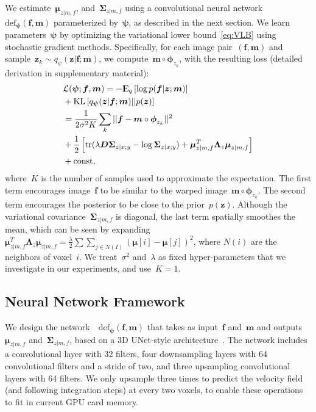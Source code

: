 \documentclass{article}
\newcommand{\bD}{\boldsymbol{D}}
\newcommand{\bmu}{\boldsymbol{\mu}}
\newcommand{\bphi}{\boldsymbol{\phi}}
\newcommand{\bpsi}{\boldsymbol{\psi}}
\newcommand{\bSigma}{\boldsymbol{\Sigma}}
\newcommand{\bLambda}{\boldsymbol{\Lambda}}
\newcommand{\KL}{\text{KL}}
\newcommand{\bz}{\boldsymbol{z}}
\newcommand{\bmoving}{\boldsymbol{m}}
\newcommand{\bfixed}{\boldsymbol{f}}
\newcommand{\moving}{m}
\newcommand{\fixed}{f}
\newcommand{\Expect}{{\rm I\kern-.3em E}}
\newcommand{\citep}{\cite}
\begin{document}
We estimate~$\bmu_{z | \moving, \fixed}$, and~$\bSigma_{z | \moving, \fixed}$ using a convolutional neural network~$\text{def}_{\bpsi}(\bfixed,\bmoving)$ parameterized by~$\bpsi$, as described in the next section.
We learn parameters~$\bpsi$ by optimizing the variational lower bound~\eqref{eq:VLB} using stochastic gradient methods. Specifically, for each image pair~$(\bfixed, \bmoving)$ and sample~$\bz_k\sim q_{\psi}(\bz|\bfixed; \bmoving)$, we compute~$\bmoving \circ \bphi_{z_k}$,
with the resulting loss (detailed derivation in supplementary material):
\begin{align}
&\mathcal{L}(\bpsi; \bfixed, \bmoving)  = - \Expect_{q} \left[ \log p(\bfixed | \bz ; \bmoving) \right] \nonumber\\
&+ \KL \left[  q_{\bpsi}(\bz|\bfixed; \bmoving) ||  p(\bz)  \right]   \nonumber \\
&= \frac{1}{2\sigma^2K} \sum_k ||\bfixed - \bmoving \circ \bphi_{z_k}||^2 \nonumber \\
&+ \frac{1}{2} \left[ \text{tr}(\lambda\bD \bSigma_{z|x;y} - \log\bSigma_{z|x;y}) + \bmu_{z | \moving, \fixed}^T \bLambda_z \bmu_{z | \moving, \fixed} \right] \nonumber \\
&+ \text{const}, 
\label{eq:main_loss}
\end{align}
where~$K$ is the number of samples used to approximate the expectation. 
The first term encourages image~$\bfixed$ to be similar to the warped image~$\bmoving \circ \bphi_{z_k}$. The second term encourages the posterior to be close to the prior~$p(\bz)$. Although the variational covariance~$\bSigma_{z|\moving,\fixed}$ is diagonal, the last term spatially smoothes the mean, which can be seen by expanding
~$\bmu_{z | \moving, \fixed}^T \bLambda_z \bmu_{z | \moving, \fixed} = \frac{\lambda}{2} \sum \sum_{j\in N(I)} (\bmu[i] - \bmu[j])^2$,
where
$N(i)$ are the neighbors of voxel~$i$. We treat~$\sigma^2$ and~$\lambda$ as fixed hyper-parameters that we investigate in our experiments, and use~$K=1$.



\subsection{Neural Network Framework}




We design the network~~$\text{def}_{\bpsi}(\bfixed,\bmoving)$ that takes as input~$\bfixed$ and~$\bmoving$ and outputs~$\bmu_{z|\moving,\fixed}$ and~$\bSigma_{z|\moving,\fixed}$, based on a 3D UNet-style architecture~\citep{ronneberger2015}. {\color{blue}The network includes a convolutional layer with 32 filters, four downsampling layers with 64 convolutional filters and a stride of two, and three upsampling convolutional layers with 64 filters. We only upsample three times to predict the velocity field (and following integration steps) at every two voxels, to enable these operations to fit in current GPU card memory.}
\end{document}
